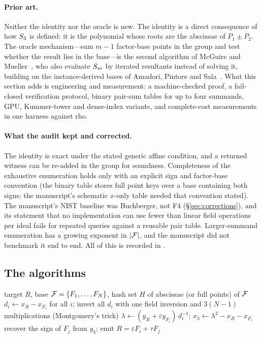 \paragraph{Prior art.} Neither the identity nor the oracle is new. The
identity is a direct consequence of how $S_{3}$ is defined: it is the
polynomial whose roots are the abscissae of $P_1\pm P_2$. The oracle
mechanism---sum $m-1$ factor-base points in the group and test whether the
result lies in the base---is the second algorithm of McGuire and
Mueller~\cite{mcguire2017}, who also evaluate $S_{m}$ by iterated
resultants instead of solving it, building on the instance-derived bases of
Amadori, Pintore and Sala~\cite{aps2018}. What this section adds is
engineering and measurement: a machine-checked proof, a fail-closed
verification protocol, binary pair-sum tables for up to four summands,
GPU, Kummer-tower and dense-index variants, and complete-cost measurements
in one harness against rho.

\paragraph{What the audit kept and corrected.} The identity is exact under
the stated generic affine condition, and a returned witness can be re-added
in the group for soundness. Completeness of the exhaustive enumeration
holds only with an explicit sign and factor-base convention (the binary
table stores full point keys over a base containing both signs; the
manuscript's schematic $x$-only table needed that convention stated). The
manuscript's NIST baseline was Buchberger, not F4
(\S\ref{sec:corrections}), and its statement that no implementation can
use fewer than linear field operations per ideal fails for repeated
queries against a reusable pair table. Larger-summand enumeration has a
growing exponent in $\lvert \mathcal{F} \rvert$, and the manuscript did not benchmark it end
to end. All of this is recorded in
.

\subsection{The algorithms}

\begin{algorithm}[t]
\caption[]{Prime two-summand oracle by direct subtraction}\label{alg:prime}
\begin{algorithmic}[1]
\Require target $R$, base $\mathcal{F}=\{F_1,\ldots,F_N\}$, hash set $H$ of
abscissae (or full points) of $\mathcal{F}$
\State $d_i\gets x_R-x_{F_i}$ for all $i$; invert all $d_i$ with one
  field inversion and $3(N-1)$ multiplications (Montgomery's trick)
    \State $\lambda\gets(y_R+\varepsilon y_{F_i})\,d_i^{-1}$;\quad
           $x_3\gets\lambda^2-x_R-x_{F_i}$ 
     recover the sign of $F_j$ from $y_3$; emit
      $R=\varepsilon F_i+\tau F_j$ \EndIf
  \EndFor
\EndFor
\end{algorithmic}
\end{algorithm}

